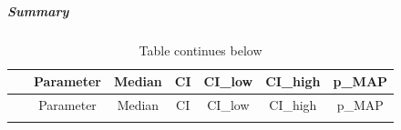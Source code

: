 \documentclass[
]{article}
\begin{document}
\hypertarget{summary}{%
\subparagraph{Summary}\label{summary}}

\begin{longtable}[]{@{}ccccccc@{}}
\caption{Table continues below}\tabularnewline
\toprule
\begin{minipage}[b]{0.09\columnwidth}\centering
~\strut
\end{minipage} & \begin{minipage}[b]{0.25\columnwidth}\centering
Parameter\strut
\end{minipage} & \begin{minipage}[b]{0.11\columnwidth}\centering
Median\strut
\end{minipage} & \begin{minipage}[b]{0.05\columnwidth}\centering
CI\strut
\end{minipage} & \begin{minipage}[b]{0.10\columnwidth}\centering
CI\_low\strut
\end{minipage} & \begin{minipage}[b]{0.10\columnwidth}\centering
CI\_high\strut
\end{minipage} & \begin{minipage}[b]{0.11\columnwidth}\centering
p\_MAP\strut
\end{minipage}\tabularnewline
\midrule
\endfirsthead
\toprule
\begin{minipage}[b]{0.09\columnwidth}\centering
~\strut
\end{minipage} & \begin{minipage}[b]{0.25\columnwidth}\centering
Parameter\strut
\end{minipage} & \begin{minipage}[b]{0.11\columnwidth}\centering
Median\strut
\end{minipage} & \begin{minipage}[b]{0.05\columnwidth}\centering
CI\strut
\end{minipage} & \begin{minipage}[b]{0.10\columnwidth}\centering
CI\_low\strut
\end{minipage} & \begin{minipage}[b]{0.10\columnwidth}\centering
CI\_high\strut
\end{minipage} & \begin{minipage}[b]{0.11\columnwidth}\centering
p\_MAP\strut
\end{minipage}\tabularnewline
\midrule
\endhead
\begin{minipage}[t]{0.09\columnwidth}\centering

\end{minipage}
\end{longtable}
\end{document}
